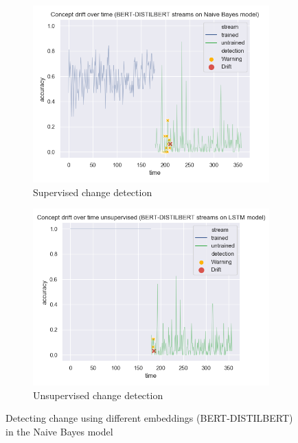 \documentclass[12pt]{report}
\begin{document}
\begin{figure}[H]
\centering
\begin{subfigure}{.5\textwidth}
  \centering
  \includegraphics[width=\linewidth]{assets/detecting-change/diff_embed_nb_wos_1_BERT_DISTILBERT.png}
  \caption{Supervised change detection}
  \label{fig:nb-diff-embed-super-B-D}
\end{subfigure}%
\begin{subfigure}{.5\textwidth}
  \centering
  \includegraphics[width=\linewidth]{assets/detecting-change/diff_embed_nb_wos_1_BERT_DISTILBERT_unsupervised.png}
  \caption{Unsupervised change detection}
  \label{fig:nb-diff-embed-unsuper-B-D}
\end{subfigure}
\caption{Detecting change using different embeddings (BERT-DISTILBERT) in the Naive Bayes model}
\label{fig:nb-diff-embed-B-D}
\end{figure}
\end{document}
